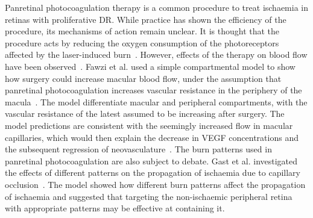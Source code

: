 \documentclass{article}
\begin{document}
Panretinal photocoagulation therapy is a common procedure to treat ischaemia in retinas with proliferative DR.
While practice has shown the efficiency of the procedure, its mechanisms of action remain unclear.
It is thought that the procedure acts by reducing the oxygen consumption of the photoreceptors affected by the laser-induced burn~\cite{Fawzi_2019,Gast_2016}.
However, effects of the therapy on blood flow have been observed~\cite{Fawzi_2019}.
Fawzi et al. used a simple compartmental model to show how surgery could increase macular blood flow, under the assumption that panretinal photocoagulation increases vascular resistance in the periphery of the macula~\cite{Fawzi_2019}.
The model differentiate macular and peripheral compartments, with the vascular resistance of the latest assumed to be increasing after surgery.
The model predictions are consistent with the seemingly increased flow in macular capillaries, which would then explain the decrease in VEGF concentrations and the subsequent regression of neovasculature~\cite{Fawzi_2019}.
The burn patterns used in panretinal photocoagulation are also subject to debate.
Gast et al. investigated the effects of different patterns on the propagation of ischaemia due to capillary occlusion~\cite{Gast_2016}.
The model showed how different burn patterns affect the propagation of ischaemia and suggested that targeting the non-ischaemic peripheral retina with appropriate patterns may be effective at containing it.
\end{document}
